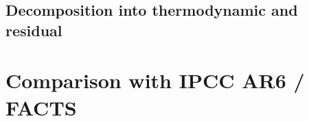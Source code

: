 \documentclass[11pt]{article}
\begin{document}
\subsection{Decomposition into thermodynamic and residual}
%
%
%
%


\section{Comparison with IPCC AR6 / FACTS}

%
%
%
%
%
%
\end{document}
